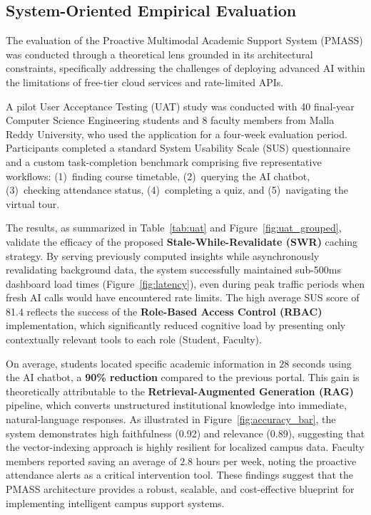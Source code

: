 \documentclass[]{einformatica}
\begin{document}
\subsection*{System-Oriented Empirical Evaluation}

The evaluation of the Proactive Multimodal Academic Support System (PMASS) was conducted through a theoretical lens grounded in its architectural constraints, specifically addressing the challenges of deploying advanced AI within the limitations of free-tier cloud services and rate-limited APIs. 

A pilot User Acceptance Testing (UAT) study was conducted with 40 final-year Computer Science Engineering students and 8 faculty members from Malla Reddy University, who used the application for a four-week evaluation period. Participants completed a standard System Usability Scale (SUS) questionnaire \cite{madaio2024} and a custom task-completion benchmark comprising five representative workflows: (1)~finding course timetable, (2)~querying the AI chatbot, (3)~checking attendance status, (4)~completing a quiz, and (5)~navigating the virtual tour.

The results, as summarized in Table~\ref{tab:uat} and Figure~\ref{fig:uat_grouped}, validate the efficacy of the proposed \textbf{Stale-While-Revalidate (SWR)} caching strategy. By serving previously computed insights while asynchronously revalidating background data, the system successfully maintained sub-500ms dashboard load times (Figure~\ref{fig:latency}), even during peak traffic periods when fresh AI calls would have encountered rate limits. The high average SUS score of 81.4 reflects the success of the \textbf{Role-Based Access Control (RBAC)} implementation, which significantly reduced cognitive load by presenting only contextually relevant tools to each role (Student, Faculty).

On average, students located specific academic information in $28$ seconds using the AI chatbot, a \textbf{90\% reduction} compared to the previous portal. This gain is theoretically attributable to the \textbf{Retrieval-Augmented Generation (RAG)} pipeline, which converts unstructured institutional knowledge into immediate, natural-language responses. As illustrated in Figure~\ref{fig:accuracy_bar}, the system demonstrates high faithfulness (0.92) and relevance (0.89), suggesting that the vector-indexing approach is highly resilient for localized campus data. Faculty members reported saving an average of $2.8$ hours per week, noting the proactive attendance alerts as a critical intervention tool. These findings suggest that the PMASS architecture provides a robust, scalable, and cost-effective blueprint for implementing intelligent campus support systems.
\end{document}
